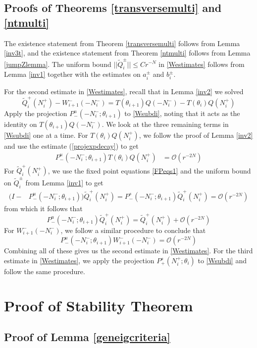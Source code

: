 \documentclass[12pt]{article}
\begin{document}
\subsection{Proofs of Theorems \ref{transversemulti} and \ref{ntmulti}}
The existence statement from Theorem \ref{transversemulti} follows from Lemma \ref{inv3t}, and the existence statement from Theorem \ref{ntmulti} follows from Lemma \ref{jumpZlemma}. The uniform bound $||\tilde{Q}_i^\pm|| \leq C r^{-N}$ in \eqref{Westimates} follows from Lemma \ref{inv1} together with the estimates on $a_i^\pm$ and $b_i^\pm$. 

For the second estimate in \eqref{Westimates}, recall that in Lemma \ref{inv2} we solved
\begin{equation}\label{Wsubdi}
\tilde{Q}_i^+(N_i^+) - W_{i+1}^-(-N_i^-) = T(\theta_{i+1}) Q(-N_i^-) - T(\theta_i) Q(N_i^+)
\end{equation}
Apply the projection $P^u_-(-N_i^-; \theta_{i+1})$ to \eqref{Wsubdi}, noting that it acts as the identity on $T(\theta_{i+1}) Q(-N_i^-)$. We look at the three remaining terms in \eqref{Wsubdi} one at a time. For $T(\theta_i) Q(N_i^+)$, we follow the proof of Lemma \ref{inv2} and use the estimate (\ref{projexpdecay}) to get
\begin{align*}
P^u_-(-N_i^-; \theta_{i+1})T(\theta_i) Q(N_i^+)
&= \mathcal{O}(r^{-2N})
\end{align*}
For $\tilde{Q}_i^+(N_i^+)$, we use the fixed point equations \eqref{FPeqs1} and the uniform bound on $\tilde{Q}_i^\pm$ from Lemma \ref{inv1} to get
\begin{align*}
(I - &P^u_-(-N_i^-; \theta_{i+1})) \tilde{Q}_i^+(N_i^+) = P^s_-(-N_i^-; \theta_{i+1}) \tilde{Q}_i^+(N_i^+) = \mathcal{O}(r^{-2N})
\end{align*}
from which it follows that
\[
P^u_-(-N_i^-; \theta_{i+1}) \tilde{Q}_i^+(N_i^+) = \tilde{Q}_i^+(N_i^+) + \mathcal{O}(r^{-2N})
\]
For $W_{i+1}^-(-N_i^-)$, we follow a similar procedure to conclude that
\[
P^u_-(-N_i^-; \theta_{i+1}) W_{i+1}^-(-N_i^-) = \mathcal{O}(r^{-2N})
\]
Combining all of these gives us the second estimate in \eqref{Westimates}. For the third estimate in \eqref{Westimates}, we apply the projection $P^s_+(N_i^+; \theta_i)$ to \eqref{Wsubdi} and follow the same procedure.

\section{Proof of Stability Theorem}

\subsection{Proof of Lemma \ref{geneigcriteria}}
\end{document}
